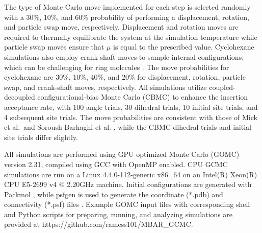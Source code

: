 \documentclass[journal=jced,manuscript=article]{achemso}
\begin{document}
The type of Monte Carlo move implemented for each step is selected randomly with a 30\%, 10\%, and 60\% probability of performing a displacement, rotation, and particle swap move, respectively. Displacement and rotation moves are required to thermally equilibrate the system at the simulation temperature while particle swap moves ensure that $\mu$ is equal to the prescribed value. Cyclohexane simulations also employ crank-shaft moves to sample internal configurations, which can be challenging for ring molecules \cite{Shah2011}. The move probabilities for cyclohexane are 30\%, 10\%, 40\%, and 20\% for displacement, rotation, particle swap, and crank-shaft moves, respectively. All simulations utilize coupled-decoupled configurational-bias Monte Carlo (CBMC)\cite{Martin1999} to enhance the insertion acceptance rate, with 100 angle trials, 30 dihedral trials, 10 initial site trials, and 4 subsequent site trials. The move probabilities are consistent with those of Mick et al.~and Soroush Barhaghi et al. \cite{Potoff_branched,Barhaghi2017}, while the CBMC dihedral trials and initial site trials differ slightly.

All simulations are performed using GPU optimized Monte Carlo (GOMC) \cite{Nejahi2018} version 2.31, compiled using GCC with OpenMP enabled. CPU GCMC simulations are run on a Linux 4.4.0-112-generic x86\_64 on an Intel(R) Xeon(R) CPU E5-2699 v4 @ 2.20GHz machine. Initial configurations are generated with Packmol \cite{PACKMOL}, while psfgen is used to generate the coordinate (*.pdb) and connectivity (*.psf) files \cite{VMD}. Example GOMC input files with corresponding shell and Python scripts for preparing, running, and analyzing simulations are provided at https://github.com/ramess101/MBAR\_GCMC.


\end{document}

